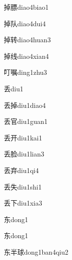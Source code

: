 \begin{verbete}[11;15]{掉膘}{diao4biao1}
\end{verbete}
\begin{verbete}[11;4]{掉队}{diao4dui4}
\end{verbete}
\begin{verbete}[11;8]{掉转}{diao4huan3}
\end{verbete}
\begin{verbete}[11;8]{掉线}{diao4xian4}
\end{verbete}
\begin{verbete}[5;15]{叮嘱}{ding1zhu3}
\end{verbete}
\begin{verbete}[6]{丢}{diu1}
\end{verbete}
\begin{verbete}[6;11]{丢掉}{diu1diao4}
\end{verbete}
\begin{verbete}[6;8]{丢官}{diu1guan1}
\end{verbete}
\begin{verbete}[6;4]{丢开}{diu1kai1}
\end{verbete}
\begin{verbete}[6;11]{丢脸}{diu1lian3}
\end{verbete}
\begin{verbete}[6;7]{丢弃}{diu1qi4}
\end{verbete}
\begin{verbete}[6;5]{丢失}{diu1shi1}
\end{verbete}
\begin{verbete}[6;3]{丢下}{diu1xia3}
\end{verbete}
\begin{verbete}[5]{东}{dong1}
\end{verbete}
\begin{verbete*}[5]{东}{dong1}
\end{verbete*}
\begin{verbete*}[5;5;11]{东半球}{dong1ban4qiu2}
\end{verbete*}
